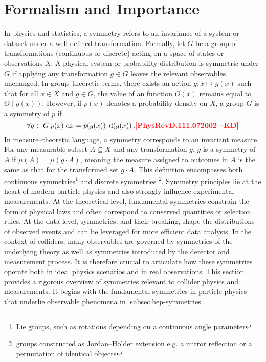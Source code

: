 \section{Formalism and Importance}
\label{sec:formalism-and-role}
    In physics and statistics, a symmetry refers to an invariance of a system or dataset under a well-defined transformation.
    Formally, let $G$ be a group of transformations (continuous or discrete) acting on a space of states or observations $X$.
    A physical system or probability distribution is symmetric under $G$ if applying any transformation $g \in G$ leaves the relevant observables unchanged.
    In group--theoretic terms, there exists an action $g: x \mapsto g(x)$ such that for all $x \in X$ and $g \in G$, the value of an function $O(x)$ remains equal to $O(g(x))$.
    However, if $p(x)$ denotes a probability density on $X$, a group $G$ is a symmetry of \(p\) if
    \[
        \forall g \in G \; p(x) \; \dd x = p(g(x)) \; \dd(g(x)).\kd{PhysRevD.111.072002}
    \]
    In measure--theoretic language, a symmetry corresponds to an invariant measure.
    For any measurable subset $A \subseteq X$ and any transformation $g$, \(g\) is a symmetry of \(A\) if $\mu(A) = \mu(g\cdot A)$, meaning the measure assigned to outcomes in $A$ is the same as that for the transformed set $g\cdot A$.
    This definition encompasses both continuous symmetries\footnote{Lie groups, such as rotations depending on a continuous angle parameter} and discrete symmetries \footnote{groups constructed as Jordan--H\"older extension e.g. a mirror reflection or a permutation of identical objects}.
    Symmetry principles lie at the heart of modern particle physics and also strongly influence experimental measurements.
    At the theoretical level, fundamental symmetries constrain the form of physical laws and often correspond to conserved quantities or selection rules.
    At the data level, symmetries, and their breaking, shape the distributions of observed events and can be leveraged for more efficient data analysis.
    In the context of colliders, many observables are governed by symmetries of the underlying theory as well as symmetries introduced by the detector and measurement process.
    It is therefore crucial to articulate how these symmetries operate both in ideal physics scenarios and in real observations.
    This section provides a rigorous overview of symmetries relevant to collider physics and measurements.
    It begins with the fundamental symmetries in particle physics that underlie observable phenomena in \cref{subsec:hep-symmetries}.
